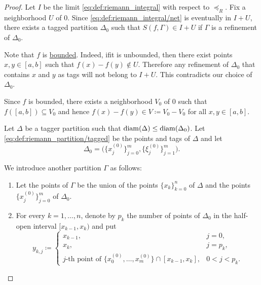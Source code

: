 \begin{proof}
   Let \( I \) be the limit \eqref{eq:def:riemann_integral} with respect to \( \preceq_R \). Fix a neighborhood \( U \) of \( 0 \). Since \eqref{eq:def:riemann_integral/net} is eventually in \( I + U \), there exists a tagged partition \( \Delta_0 \) such that \( S(f, \Gamma) \in I + U \) if \( \Gamma \) is a refinement of \( \Delta_0 \).

  Note that \( f \) is \hyperref[def:bounded_function/bounded]{bounded}. Indeed, if\LEM it is unbounded, then there exist points \( x, y \in [a, b] \) such that \( f(x) - f(y) \not\in U \). Therefore any refinement of \( \Delta_0 \) that contains \( x \) and \( y \) as tags will not belong to \( I + U \). This contradicts our choice of \( \Delta_0 \).

  Since \( f \) is bounded, there exists a neighborhood \( V_0 \) of \( 0 \) such that \( f([a, b]) \subseteq V_0 \) and hence \( f(x) - f(y) \in V \coloneqq V_0 - V_0 \) for all \( x, y \in [a, b] \).

  Let \( \Delta \) be a tagger partition such that \( \operatorname{diam}(\Delta) \leq \operatorname{diam}(\Delta_0) \). Let \eqref{eq:def:riemann_partition/tagged} be the points and tags of \( \Delta \) and let
  \begin{equation*}
    \Delta_0 = \Big( \{ x_j^{(0)} \}_{j=0}^m, \{ \xi_j^{(0)} \}_{j=1}^m \Big).
  \end{equation*}

  We introduce another partition \( \Gamma \) as follows:
  \begin{enumerate}
    \item Let the points of \( \Gamma \) be the union of the points \( \{ x_k \}_{k=0}^n \) of \( \Delta \) and the points \( \{ x_j^{(0)} \}_{j=0}^m \) of \( \Delta_0 \).

    \item For every \( k = 1, \ldots, n \), denote by \( p_k \) the number of points of \( \Delta_0 \) in the half-open interval \( [x_{k-1}, x_k) \) and put
    \begin{equation*}
      y_{k,j} \coloneqq \begin{cases}
        x_{k-1},                                                                          &j = 0, \\
        x_k,                                                                              &j = p_k, \\
        j\text{-th point of } \{ x_0^{(0)}, \ldots, x_m^{(0)} \} \cap [x_{k-1}, x_k], &0 < j < p_k.
      \end{cases}
    \end{equation*}


\end{enumerate}
\end{proof}
